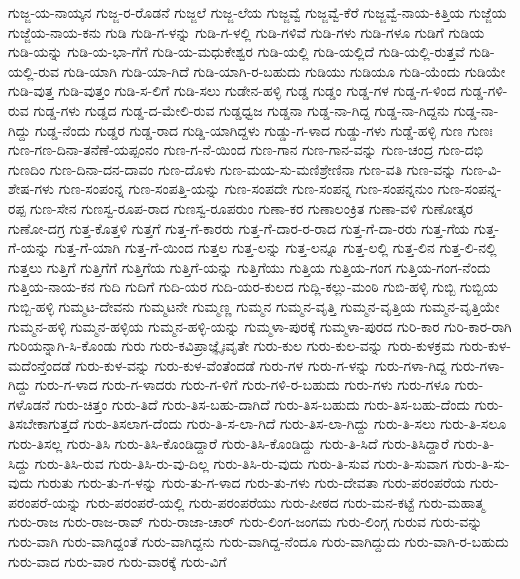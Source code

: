 ಗುಜ್ಜ-ಯ-ನಾಯ್ಕನ
ಗುಜ್ಜ-ರ-ರೊಡನೆ
ಗುಜ್ಜಲೆ
ಗುಜ್ಜ-ಲೆಯ
ಗುಜ್ಜವ್ವೆ
ಗುಜ್ಜವ್ವೆ-ಕೆರೆ
ಗುಜ್ಜವ್ವೆ-ನಾಯ-ಕಿತ್ತಿಯ
ಗುಜ್ಜೆಯ
ಗುಜ್ಜೆಯ-ನಾಯ-ಕನು
ಗುಡಿ
ಗುಡಿ-ಗ-ಳನ್ನು
ಗುಡಿ-ಗ-ಳಲ್ಲಿ
ಗುಡಿ-ಗಳಿವೆ
ಗುಡಿ-ಗಳು
ಗುಡಿ-ಗಳೂ
ಗುಡಿಗೆ
ಗುಡಿಯ
ಗುಡಿ-ಯನ್ನು
ಗುಡಿ-ಯ-ಭಾ-ಗೆಗೆ
ಗುಡಿ-ಯ-ಮಧುಕೇಶ್ವರ
ಗುಡಿ-ಯಲ್ಲಿ
ಗುಡಿ-ಯಲ್ಲಿದೆ
ಗುಡಿ-ಯಲ್ಲಿ-ರುತ್ತವೆ
ಗುಡಿ-ಯಲ್ಲಿ-ರುವ
ಗುಡಿ-ಯಾಗಿ
ಗುಡಿ-ಯಾ-ಗಿದೆ
ಗುಡಿ-ಯಾಗಿ-ರ-ಬಹುದು
ಗುಡಿಯು
ಗುಡಿಯೂ
ಗುಡಿ-ಯೆಂದು
ಗುಡಿಯೇ
ಗುಡಿ-ವುತ್ತ
ಗುಡಿ-ವುತ್ತಂ
ಗುಡಿ-ಸ-ಲಿಗೆ
ಗುಡಿ-ಸಲು
ಗುಡೇನ-ಹಳ್ಳಿ
ಗುಡ್ಡ
ಗುಡ್ಡಂ
ಗುಡ್ಡ-ಗಳ
ಗುಡ್ಡ-ಗ-ಳಿಂದ
ಗುಡ್ಡ-ಗಳಿ-ರುವ
ಗುಡ್ಡ-ಗಳು
ಗುಡ್ಡದ
ಗುಡ್ಡ-ದ-ಮೇಲಿ-ರುವ
ಗುಡ್ಡಧ್ವಜ
ಗುಡ್ಡನಾ
ಗುಡ್ಡ-ನಾ-ಗಿದ್ದ
ಗುಡ್ಡ-ನಾ-ಗಿದ್ದನು
ಗುಡ್ಡ-ನಾ-ಗಿದ್ದು
ಗುಡ್ಡ-ನೆಂದು
ಗುಡ್ಡರ
ಗುಡ್ಡ-ರಾದ
ಗುಡ್ಡಿ-ಯಾಗಿದ್ದಳು
ಗುಡ್ಡು-ಗ-ಳಾದ
ಗುಡ್ಡು-ಗಳು
ಗುಡ್ಡೆ-ಹಳ್ಳಿ
ಗುಣ
ಗುಣಃ
ಗುಣ-ಗಣ-ದಿನಾ-ತನೆಣೆ-ಯಪ್ಪಂನಂ
ಗುಣ-ಗ-ನೆ-ಯಿಂದ
ಗುಣ-ಗಾನ
ಗುಣ-ಗಾನ-ವನ್ನು
ಗುಣ-ಚಂದ್ರ
ಗುಣ-ದಭಿ
ಗುಣದಿಂ
ಗುಣ-ದಿನಾ-ದನ-ದಾವಂ
ಗುಣ-ದೊಳು
ಗುಣ-ಮಯ-ಸು-ಮಣಿಶ್ರೇಣಿನಾ
ಗುಣ-ವತಿ
ಗುಣ-ವನ್ನು
ಗುಣ-ವಿ-ಶೇಷ-ಗಳು
ಗುಣ-ಸಂಪಂನ್ನ
ಗುಣ-ಸಂಪತ್ತಿ-ಯನ್ನು
ಗುಣ-ಸಂಪದೇ
ಗುಣ-ಸಂಪನ್ನ
ಗುಣ-ಸಂಪನ್ನನುಂ
ಗುಣ-ಸಂಪನ್ನ-ರಪ್ಪ
ಗುಣ-ಸೇನ
ಗುಣಸ್ವ-ರೂಪ-ರಾದ
ಗುಣಸ್ವ-ರೂಪರುಂ
ಗುಣಾ-ಕರ
ಗುಣಾಲಂಕ್ರಿತ
ಗುಣಾ-ವಳಿ
ಗುಣೋತ್ಕರ
ಗುಣೋ-ದಗ್ರ
ಗುತ್ತ-ಕೊತ್ತಳಿ
ಗುತ್ತಗೆ
ಗುತ್ತ-ಗೆ-ಕಾರರು
ಗುತ್ತ-ಗೆ-ದಾರ-ರ-ರಾದ
ಗುತ್ತ-ಗೆ-ದಾ-ರರು
ಗುತ್ತ-ಗೆಯ
ಗುತ್ತ-ಗೆ-ಯನ್ನು
ಗುತ್ತ-ಗೆ-ಯಾಗಿ
ಗುತ್ತ-ಗೆ-ಯಿಂದ
ಗುತ್ತಲ
ಗುತ್ತ-ಲನ್ನು
ಗುತ್ತ-ಲನ್ನೂ
ಗುತ್ತ-ಲಲ್ಲಿ
ಗುತ್ತ-ಲಿನ
ಗುತ್ತ-ಲಿ-ನಲ್ಲಿ
ಗುತ್ತಲು
ಗುತ್ತಿಗೆ
ಗುತ್ತಿಗೆಗೆ
ಗುತ್ತಿಗೆಯ
ಗುತ್ತಿಗೆ-ಯನ್ನು
ಗುತ್ತಿಗೆಯು
ಗುತ್ತಿಯ
ಗುತ್ತಿಯ-ಗಂಗ
ಗುತ್ತಿಯ-ಗಂಗ-ನೆಂದು
ಗುತ್ತಿಯ-ನಾಯ-ಕನ
ಗುದಿ
ಗುದಿಗೆ
ಗುದಿ-ಯರ
ಗುದಿ-ಯರ-ಕುಲದ
ಗುದ್ಲಿ-ಕಲ್ಲು-ಮಂಠಿ
ಗುಬಿ-ಹಳ್ಳಿ
ಗುಬ್ಬಿ
ಗುಬ್ಬಿಯ
ಗುಬ್ಬಿ-ಹಳ್ಳಿ
ಗುಮ್ಮಟ-ದೇವನು
ಗುಮ್ಮಟನೇ
ಗುಮ್ಮಣ್ಣ
ಗುಮ್ಮನ
ಗುಮ್ಮನ-ವೃತ್ತಿ
ಗುಮ್ಮನ-ವೃತ್ತಿಯ
ಗುಮ್ಮನ-ವೃತ್ತಿಯೇ
ಗುಮ್ಮನ-ಹಳ್ಳಿ
ಗುಮ್ಮನ-ಹಳ್ಳಿಯ
ಗುಮ್ಮನ-ಹಳ್ಳಿ-ಯನ್ನು
ಗುಮ್ಮಳಾ-ಪುರಕ್ಕೆ
ಗುಮ್ಮಳಾ-ಪುರದ
ಗುರಿ-ಕಾರ
ಗುರಿ-ಕಾರ-ರಾಗಿ
ಗುರಿಯನ್ನಾಗಿ-ಸಿ-ಕೊಂಡು
ಗುರು
ಗುರು-ಕವಿಪ್ರಾಜ್ಞೈಃವೃತೇ
ಗುರು-ಕುಲ
ಗುರು-ಕುಲ-ವನ್ನು
ಗುರು-ಕುಳಕ್ರಮ
ಗುರು-ಕುಳ-ಮದೆಂನ್ತೆಂದಡೆ
ಗುರು-ಕುಳ-ವನ್ನು
ಗುರು-ಕುಳ-ವೆಂತೆಂದಡೆ
ಗುರು-ಗಳ
ಗುರು-ಗ-ಳನ್ನು
ಗುರು-ಗಳಾ-ಗಿದ್ದ
ಗುರು-ಗಳಾ-ಗಿದ್ದು
ಗುರು-ಗ-ಳಾದ
ಗುರು-ಗ-ಳಾದರು
ಗುರು-ಗ-ಳಿಗೆ
ಗುರು-ಗಳಿ-ರ-ಬಹುದು
ಗುರು-ಗಳು
ಗುರು-ಗಳೂ
ಗುರು-ಗಳೊಡನೆ
ಗುರು-ಚಿತ್ತಂ
ಗುರು-ತಿದೆ
ಗುರು-ತಿಸ-ಬಹು-ದಾಗಿದೆ
ಗುರು-ತಿಸ-ಬಹುದು
ಗುರು-ತಿಸ-ಬಹು-ದೆಂದು
ಗುರು-ತಿಸಬೇಕಾಗುತ್ತದೆ
ಗುರು-ತಿಸಲಾಗ-ದೆಂದು
ಗುರು-ತಿ-ಸ-ಲಾ-ಗಿದೆ
ಗುರು-ತಿಸ-ಲಾ-ಗಿದ್ದು
ಗುರು-ತಿ-ಸಲು
ಗುರು-ತಿ-ಸಲೂ
ಗುರು-ತಿಸಲ್ಲ
ಗುರು-ತಿಸಿ
ಗುರು-ತಿಸಿ-ಕೊಂಡಿದ್ದಾರೆ
ಗುರು-ತಿಸಿ-ಕೊಂಡಿದ್ದು
ಗುರು-ತಿ-ಸಿದೆ
ಗುರು-ತಿಸಿದ್ದಾರೆ
ಗುರು-ತಿ-ಸಿದ್ದು
ಗುರು-ತಿಸಿ-ರುವ
ಗುರು-ತಿಸಿ-ರು-ವು-ದಿಲ್ಲ
ಗುರು-ತಿಸಿ-ರು-ವುದು
ಗುರು-ತಿ-ಸುವ
ಗುರು-ತಿ-ಸುವಾಗ
ಗುರು-ತಿ-ಸು-ವುದು
ಗುರುತು
ಗುರು-ತು-ಗ-ಳನ್ನು
ಗುರು-ತು-ಗ-ಳಾದ
ಗುರು-ತು-ಗಳು
ಗುರು-ದೇವತಾ
ಗುರು-ಪರಂಪರೆಯ
ಗುರು-ಪರಂಪರೆ-ಯನ್ನು
ಗುರು-ಪರಂಪರೆ-ಯಲ್ಲಿ
ಗುರು-ಪರಂಪರೆಯು
ಗುರು-ಪೀಠದ
ಗುರು-ಮನ-ಕಟ್ಟೆ
ಗುರು-ಮಹಾತ್ಮ
ಗುರು-ರಾಜ
ಗುರು-ರಾಜ-ರಾವ್
ಗುರು-ರಾಜಾ-ಚಾರ್
ಗುರು-ಲಿಂಗ-ಜಂಗಮ
ಗುರು-ಲಿಂಗ್ಗ
ಗುರುವ
ಗುರು-ವನ್ನು
ಗುರು-ವಾಗಿ
ಗುರು-ವಾಗಿದ್ದಂತೆ
ಗುರು-ವಾಗಿದ್ದನು
ಗುರು-ವಾಗಿದ್ದ-ನೆಂದೂ
ಗುರು-ವಾಗಿದ್ದುದು
ಗುರು-ವಾಗಿ-ರ-ಬಹುದು
ಗುರು-ವಾದ
ಗುರು-ವಾರ
ಗುರು-ವಾರಕ್ಕೆ
ಗುರು-ವಿಗೆ
